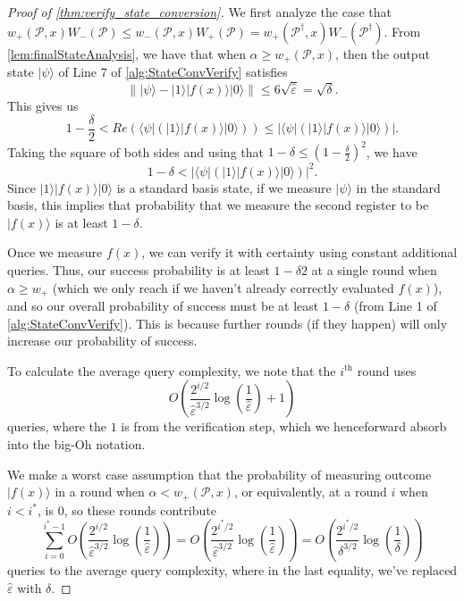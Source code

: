 \documentclass[cleveref, autoref, thm-restate,11pt]{article}
\theoremstyle{definition}
\newcommand{\ket}[1]{|#1\rangle}
\newcommand{\bra}[1]{\langle#1|}
\renewcommand{\wp}[2]{{w_+({#1},{#2})}}
\begin{document}
\begin{proof}[Proof of \cref{thm:verify_state_conversion}]
 We first analyze the case that $w_+(\mathscr P,x)W_-(\mathscr P)\leq w_-(\mathscr P,x)W_+(\mathscr P)=w_+(\mathscr P^\dagger,x)W_-(\mathscr P^\dagger)$.
From \cref{lem:finalStateAnalysis}, we have that when $\alpha\geq \wp{\mathscr P}{x}$, then the output state $\ket{\psi}$ of Line 7 of \cref{alg:StateConvVerify} satisfies
\begin{equation}
\|\ket{\psi}-\ket{1}\ket{f(x)}\ket{0}\|\leq 6\sqrt{\hat{\varepsilon}}=\sqrt{\delta}.
\end{equation}
This gives us 
\begin{equation}
1 -  \frac{\delta}{2} < Re\left(\bra{\psi}(\ket{1}\ket{f(x)}\ket{0})\right)\leq\left|\bra{\psi}(\ket{1}\ket{f(x)}\ket{0})\right|.
\end{equation}
Taking the square of both sides and using that $1-\delta \leq \left(1 -  \frac{\delta}{2}\right)^2$, we have
\begin{equation}
1 -  \delta < \left|\bra{\psi}(\ket{1}\ket{f(x)}\ket{0})\right|^2.
\end{equation}
Since $\ket{1}\ket{f(x)}\ket{0}$ is a standard basis state, if we measure $\ket{\psi}$ in the standard basis, this implies that probability that we measure the second register to be
$\ket{f(x)}$ is at least $1-\delta.$

Once we measure $f(x)$, we can verify it with certainty using constant
additional queries. Thus, our success probability is at least $1-\delta2$ at
a single round when $\alpha\geq w_+$ (which we only reach if we haven't
already correctly evaluated $f(x)$), and so our overall probability of success must be
at least $1-\delta$ (from Line 1 of \cref{alg:StateConvVerify}). This is because further rounds (if they happen) will only increase
our probability of success.

To calculate the average query complexity, we note that the $i^\textrm{th}$ round
uses
\begin{equation}
O\left(\frac{2^{i/2}}{\hat{\varepsilon}^{3/2}}\log\left(\frac{1}{\hat{\varepsilon}}\right)+1\right)
\end{equation}
queries, where the $1$ is from the verification step, which we henceforward absorb into the big-Oh notation.

We make a worst case assumption that
the probability of measuring outcome $\ket{f(x)}$ in a round when 
$\alpha< \wp{\mathscr P}{x}$, or equivalently, at a round $i$ when $i<i^*$, is 0, so these rounds contribute
\begin{equation}
\sum_{i=0}^{i^*-1}O\left(\frac{2^{i/2}}{\hat{\varepsilon}^{3/2}}\log\left(\frac{1}{\hat{\varepsilon}}\right)\right)=O\left(\frac{2^{i^*/2}}{\hat{\varepsilon}^{3/2}}\log\left(\frac{1}{\hat{\varepsilon}}\right)\right)=O\left(\frac{2^{i^*/2}}{\delta^{3/2}}\log\left(\frac{1}{\delta}\right)\right)
\end{equation}
queries to the average query complexity, where in the last equality, we've 
replaced $\hat{\varepsilon}$ with $\delta$.


\end{proof}
\end{document}
